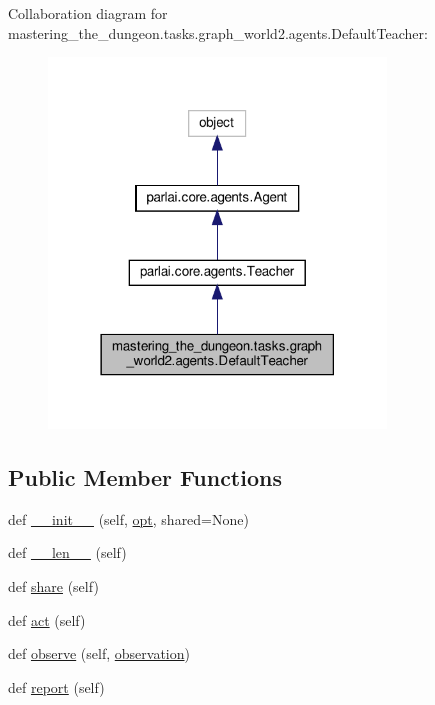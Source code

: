 Collaboration diagram for mastering\+\_\+the\+\_\+dungeon.\+tasks.\+graph\+\_\+world2.\+agents.\+Default\+Teacher\+:
\nopagebreak
\begin{figure}[H]
\begin{center}
\leavevmode
\includegraphics[width=254pt]{classmastering__the__dungeon_1_1tasks_1_1graph__world2_1_1agents_1_1DefaultTeacher__coll__graph}
\end{center}
\end{figure}
\subsection*{Public Member Functions}
\begin{DoxyCompactItemize}
\item 
def \hyperlink{classmastering__the__dungeon_1_1tasks_1_1graph__world2_1_1agents_1_1DefaultTeacher_a9eecc8e9bee9b1c570c0a1f35002f521}{\+\_\+\+\_\+init\+\_\+\+\_\+} (self, \hyperlink{classmastering__the__dungeon_1_1tasks_1_1graph__world2_1_1agents_1_1DefaultTeacher_a26677214b4b57579aa8e3ad2e17aab6c}{opt}, shared=None)
\item 
def \hyperlink{classmastering__the__dungeon_1_1tasks_1_1graph__world2_1_1agents_1_1DefaultTeacher_a80fdadaac9670d98170a99a973daf05c}{\+\_\+\+\_\+len\+\_\+\+\_\+} (self)
\item 
def \hyperlink{classmastering__the__dungeon_1_1tasks_1_1graph__world2_1_1agents_1_1DefaultTeacher_a39e2feb7177317317f6071f5ac53f392}{share} (self)
\item 
def \hyperlink{classmastering__the__dungeon_1_1tasks_1_1graph__world2_1_1agents_1_1DefaultTeacher_a5ccf5764a4f27819a6b6b7c0cda603bf}{act} (self)
\item 
def \hyperlink{classmastering__the__dungeon_1_1tasks_1_1graph__world2_1_1agents_1_1DefaultTeacher_a18a9dbc8920fcfa3e630b70baaf9185f}{observe} (self, \hyperlink{classmastering__the__dungeon_1_1tasks_1_1graph__world2_1_1agents_1_1DefaultTeacher_a63a414cac3b8cdf3d50546cf5cfb1552}{observation})
\item 
def \hyperlink{classmastering__the__dungeon_1_1tasks_1_1graph__world2_1_1agents_1_1DefaultTeacher_a43724e1d29237d75534ca6a77255dde8}{report} (self)
\end{DoxyCompactItemize}
